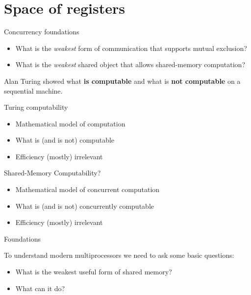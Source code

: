 \section{Space of registers}
\showTOC


\begin{frame}[t]{Concurrency foundations}

\begin{itemize}
  \item What is the \textit{weakest} form of communication that supports mutual exclusion?
  \pause
  \item What is the \textit{weakest} shared object that allows shared-memory computation?  
\end{itemize}

\pause
Alan Turing showed what \textbf{is computable} and what is \textbf{not computable} on a sequential machine.

\pause

Turing computability
\begin{itemize}
  \item Mathematical model of computation
  \item What is (and is not) computable
  \item Efficiency (mostly) irrelevant
\end{itemize}

\pause

Shared-Memory Computability?
\pause
\begin{itemize}
  \item Mathematical model of concurrent computation
  \item What is (and is not) concurrently computable
  \item Efficiency (mostly) irrelevant
\end{itemize}

\end{frame}


\begin{frame}[t]{Foundations}

To understand modern multiprocessors we need to ask some basic questions:
\begin{itemize}
  \pause
  \item What is the weakest useful form of shared memory?
  \pause
  \item What can it do?
\end{itemize}

\end{frame}


